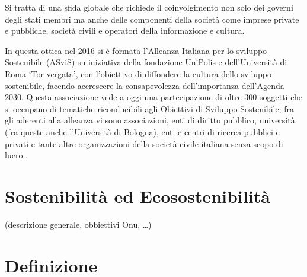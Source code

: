 Si tratta di una sfida globale che richiede il coinvolgimento non solo dei governi degli stati membri ma anche delle componenti della società come imprese private e pubbliche, società civili e operatori della informazione e cultura.

In questa ottica nel 2016 si è formata l'Alleanza Italiana per lo sviluppo Sostenibile (ASviS) \cite{asvis} su iniziativa della fondazione UniPolis e dell'Università di Roma \enquote*{Tor vergata}, con l'obiettivo di diffondere la cultura dello sviluppo sostenibile, facendo accrescere la consapevolezza dell'importanza dell'Agenda 2030.
Questa associazione vede a oggi una partecipazione di oltre 300 soggetti che si occupano di tematiche riconducibili agli Obiettivi di Sviluppo Sostenibile; fra gli aderenti alla alleanza vi sono associazioni, enti di diritto pubblico, università (fra queste anche l'Università di Bologna), enti e centri di ricerca pubblici e privati e tante altre organizzazioni della società civile italiana senza scopo di lucro \cite[Aderenti alla ASviS]{aderenti_asvis}.

%
%
\section{Sostenibilità ed Ecosostenibilità}
(descrizione generale, obbiettivi Onu, …)
\section{Definizione}
%
%

